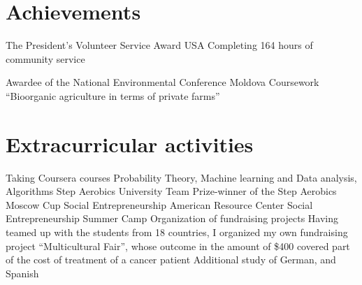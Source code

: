 \documentclass[]{cv-style}          %
\begin{document}




\section{Achievements}

\begin{entrylist}
\entry
{}
{The President’s Volunteer Service Award }
{USA}
{Completing 164 hours of community service}

\end{entrylist}
\begin{entrylist}
\entry
{}
{Awardee of the National Environmental Conference}
{Moldova}
{Coursework “Bioorganic agriculture in terms of private farms”}

\end{entrylist}



\section{Extracurricular activities}
  \vspace{-0.2cm}

\begin{entrylist}

\entry
  {}
  {Taking Coursera courses}
  {}
  {Probability Theory, Machine learning and Data analysis, Algorithms}
\entry
  {}
  {Step Aerobics University Team}
  {}
  {Prize-winner of the Step Aerobics Moscow Cup}
\entry
  {}
  {Social Entrepreneurship}
  {}
  {American Resource Center Social Entrepreneurship Summer Camp}
\entry
  {}
  {Organization of fundraising projects}
  {}
  {Having teamed up with the students from 18 countries, I organized my own fundraising project “Multicultural Fair”, whose outcome in the amount of \$400 covered part of the cost of treatment of a cancer patient}
\entry
  {}
  {Additional study of German, and Spanish}
  {}
  {}
  

\end{entrylist}
\end{document}
